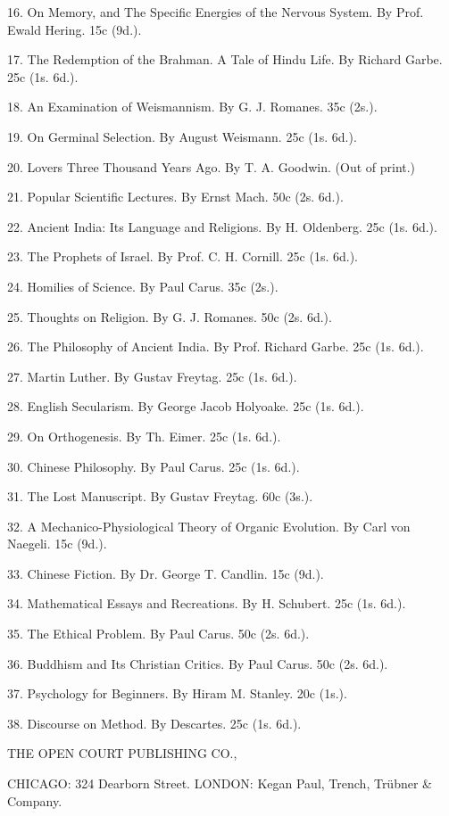 \documentclass[12pt]{book}[2005/09/16]
\renewcommand{\(}{{\upshape(}}
\renewcommand{\)}{{\upshape)}}
\begin{document}
16. On Memory, and The Specific Energies of the Nervous System. By Prof.
Ewald Hering. 15c (9d.).

17. The Redemption of the Brahman. A Tale of Hindu Life. By Richard
Garbe. 25c (1s. 6d.).

18. An Examination of Weismannism. By G. J. Romanes. 35c (2s.).

19. On Germinal Selection. By August Weismann. 25c (1s. 6d.).

20. Lovers Three Thousand Years Ago. By T. A. Goodwin. (Out of print.)

21. Popular Scientific Lectures. By Ernst Mach. 50c (2s. 6d.).

22. Ancient India: Its Language and Religions. By H. Oldenberg. 25c
(1s. 6d.).

23. The Prophets of Israel. By Prof. C. H. Cornill. 25c (1s. 6d.).

24. Homilies of Science. By Paul Carus. 35c (2s.).

25. Thoughts on Religion. By G. J. Romanes. 50c (2s. 6d.).

26. The Philosophy of Ancient India. By Prof. Richard Garbe. 25c (1s. 6d.).

27. Martin Luther. By Gustav Freytag. 25c (1s. 6d.).

28. English Secularism. By George Jacob Holyoake. 25c (1s. 6d.).

29. On Orthogenesis. By Th. Eimer. 25c (1s. 6d.).

30. Chinese Philosophy. By Paul Carus. 25c (1s. 6d.).

31. The Lost Manuscript. By Gustav Freytag. 60c (3s.).

32. A Mechanico-Physiological Theory of Organic Evolution. By Carl von
Naegeli. 15c (9d.).

33. Chinese Fiction. By Dr. George T. Candlin. 15c (9d.).

34. Mathematical Essays and Recreations. By H. Schubert. 25c (1s. 6d.).

35. The Ethical Problem. By Paul Carus. 50c (2s. 6d.).

36. Buddhism and Its Christian Critics. By Paul Carus. 50c (2s. 6d.).

37. Psychology for Beginners. By Hiram M. Stanley. 20c (1s.).

38. Discourse on Method. By Descartes. 25c (1s. 6d.).

THE OPEN COURT PUBLISHING CO.,

CHICAGO: 324 Dearborn Street.
LONDON: Kegan Paul, Trench, Trübner & Company.
\fi
\end{document}
